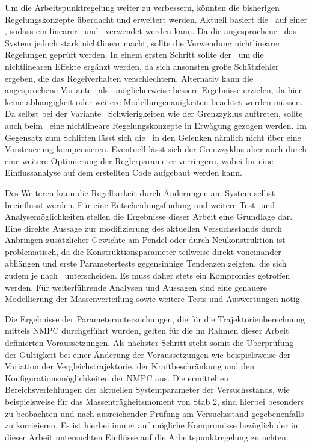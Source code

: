 Um die Arbeitspunktregelung weiter zu verbessern, könnten die bisherigen Regelungskonzepte überdacht und erweitert werden.
Aktuell basiert die \aprg\ auf einer \lin, sodass ein linearer \zsr\ und \beob\ verwendet werden kann.
Da die angesprochene \crb\ das System jedoch stark nichtlinear macht, sollte die Verwendung nichtlinearer Regelungen geprüft werden.
In einem ersten Schritt sollte der \beob\ um die nichtlinearen Effekte ergänzt werden, da sich ansonsten große Schätzfehler ergeben, die das Regelverhalten verschlechtern.
Alternativ kann die angesprochene Variante \diff\ als \ze\ möglicherweise bessere Ergebnisse erzielen, da hier keine \ap abhängigkeit oder weitere Modellungenauigkeiten beachtet werden müssen.
Da selbst bei der Variante \zm\ Schwierigkeiten wie der Grenzzyklus auftreten, sollte auch beim \zsr\ eine nichtlineare Regelungskonzepte in Erwägung gezogen werden.
Im Gegensatz zum Schlitten lässt sich die \crb\ in den Gelenken nämlich nicht über eine Vorsteuerung kompensieren.
Eventuell lässt sich der Grenzzyklus aber auch durch eine weitere Optimierung der Reglerparameter verringern, wobei für eine Einflussanalyse auf dem erstellten Code aufgebaut werden kann.

Des Weiteren kann die Regelbarkeit durch Änderungen am System selbst beeinflusst werden.
Für eine Entscheidungsfindung und weitere Test- und Analysemöglichkeiten stellen die Ergebnisse dieser Arbeit eine Grundlage dar.
Eine direkte Aussage zur modifizierung des aktuellen Versuchsstands durch Anbringen zusätzlicher Gewichte am Pendel oder durch Neukonstruktion  ist problematisch, da die Konstruktionsparameter teilweise direkt voneinander abhängen und erste Parametertests gegensinnige Tendenzen zeigten, die sich zudem je nach \ap\ unterscheiden.
Es muss daher stets ein Kompromiss getroffen werden.
Für weiterführende Analysen und Aussagen sind eine genauere Modellierung der Massenverteilung sowie weitere Tests und Auswertungen nötig.

Die Ergebnisse der Parameteruntersuchungen, die für die Trajektorienberechnung mittels NMPC durchgeführt wurden, gelten für die im Rahmen dieser Arbeit definierten Voraussetzungen. Als nächster Schritt steht somit die Überprüfung der Gültigkeit bei einer Änderung der Voraussetzungen wie beispielsweise der Variation der Vergleichstrajektorie, der Kraftbeschränkung und den Konfigurationsmöglichkeiten der NMPC aus. Die ermittelten Bereichsverfehlungen der aktuellen Systemparameter der Versuchsstands, wie beispielsweise für das Massenträgheitsmoment von Stab 2, sind hierbei besonders zu beobachten und nach ausreichender Prüfung am Versuchsstand gegebenenfalls zu korrigieren. Es ist hierbei immer auf mögliche Kompromisse bezüglich der in dieser Arbeit untersuchten Einflüsse auf die Arbeitspunktregelung zu achten.

